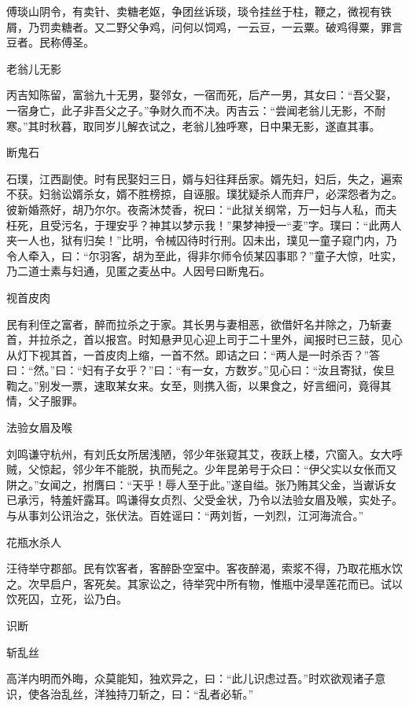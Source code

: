 \documentclass[a4paper,12pt,UTF8,twoside]{ctexbook}
\begin{document}
    傅琰山阴令，有卖针、卖糖老妪，争团丝诉琰，琰令挂丝于柱，鞭之，微视有铁屑，乃罚卖糖者。又二野父争鸡，问何以饲鸡，一云豆，一云粟。破鸡得粟，罪言豆者。民称傅圣。
    
    老翁儿无影
    
    丙吉知陈留，富翁九十无男，娶邻女，一宿而死，后产一男，其女曰：“吾父娶，一宿身亡，此子非吾父之子。”争财久而不决。丙吉云：“尝闻老翁儿无影，不耐寒。”其时秋暮，取同岁儿解衣试之，老翁儿独呼寒，日中果无影，遂直其事。
    
    断鬼石
    
    石璞，江西副使。时有民娶妇三日，婿与妇往拜岳家。婿先妇，妇后，失之，遍索不获。妇翁讼婿杀女，婿不胜榜掠，自诬服。璞犹疑杀人而弃尸，必深怨者为之。彼新婚燕好，胡乃尔尔。夜斋沐焚香，祝曰：“此狱关纲常，万一妇与人私，而夫枉死，且受污名，于理安乎？神其以梦示我！”果梦神授一“麦”字。璞曰：“此两人夹一人也，狱有归矣！”比明，令械囚待时行刑。囚未出，璞见一童子窥门内，乃令人牵入，曰：“尔羽客，胡为至此，得非尔师令侦某囚事耶？”童子大惊，吐实，乃二道士素与妇通，见匿之麦丛中。人因号曰断鬼石。
    
    视首皮肉
    
    民有利侄之富者，醉而拉杀之于家。其长男与妻相恶，欲借奸名并除之，乃斩妻首，并拉杀之，首以报宫。时知悬尹见心迎上司于二十里外，闻报时已三鼓，见心从灯下视其首，一首皮肉上缩，一首不然。即诘之曰：“两人是一时杀否？”答曰：“然。”曰：“妇有子女乎？”曰：“有一女，方数岁。”见心曰：“汝且寄狱，俟旦鞫之。”别发一票，速取某女来。女至，则携入衙，以果食之，好言细问，竟得其情，父子服罪。
    
    法验女眉及喉
    
    刘鸣谦守杭州，有刘氏女所居浅陋，邻少年张窥其艾，夜跃上楼，穴窗入。女大呼贼，父惊起，邻少年不能脱，执而髡之。少年昆弟号于众曰：“伊父实以女伥而又阱之。”女闻之，拊膺曰：“天乎！辱人至于此。”遂自缢。张乃贿其父金，当谳诉女已承污，特羞奸露耳。鸣谦得女贞烈、父受金状，乃令以法验女眉及喉，实处子。与从事刘公讯治之，张伏法。百姓谣曰：“两刘哲，一刘烈，江河海流合。”
    
    花瓶水杀人
    
    汪待举守郡部。民有饮客者，客醉卧空室中。客夜醉渴，索浆不得，乃取花瓶水饮之。次早启户，客死矣。其家讼之，待举究中所有物，惟瓶中浸旱莲花而已。试以饮死囚，立死，讼乃白。
    
    识断
    
    斩乱丝
    
    高洋内明而外晦，众莫能知，独欢异之，曰：“此儿识虑过吾。”时欢欲观诸子意识，使各治乱丝，洋独持刀斩之，曰：“乱者必斩。”
    
\end{document}
